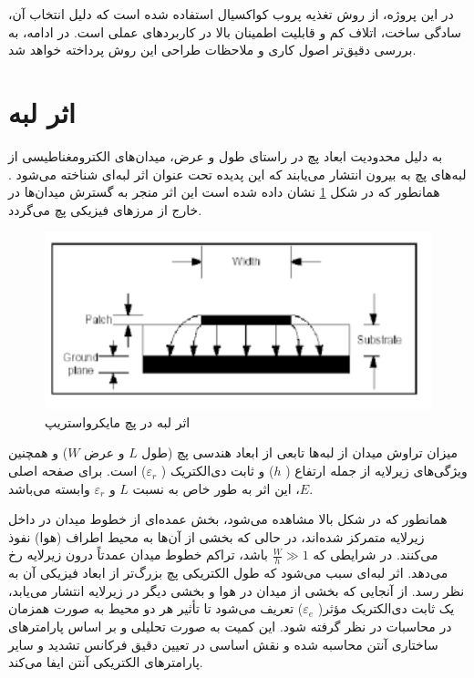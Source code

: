 در این پروژه، از روش تغذیه پروب کواکسیال استفاده شده است که دلیل انتخاب آن، سادگی ساخت، اتلاف کم و قابلیت اطمینان بالا در کاربردهای عملی است. در ادامه، به بررسی دقیق‌تر اصول کاری و ملاحظات طراحی این روش پرداخته خواهد شد.


\section{اثر لبه}

به دلیل محدودیت ابعاد پچ در راستای طول و عرض، میدان‌های الکترومغناطیسی از لبه‌های پچ به بیرون انتشار می‌یابند که این پدیده تحت عنوان اثر لبه‌ای
شناخته می‌شود
\cite{chahar}.
همانطور که در شکل 
\ref{fig8}
نشان داده شده است
این اثر منجر به گسترش میدان‌ها در خارج از مرزهای فیزیکی پچ می‌گردد.

\begin{figure}
	\centering
	\includegraphics[scale=0.3]{Images/fig8.png}
	\caption{اثر لبه در پچ مایکرواستریپ}
	\label{fig8}
\end{figure}

میزان تراوش میدان از لبه‌ها تابعی از ابعاد هندسی پچ (طول
$L$
 و عرض
$W$)
 و همچنین ویژگی‌های زیرلایه از جمله ارتفاع (
$h$)
 و ثابت دی‌الکتریک (
 $\varepsilon_r$)
 است. برای صفحه اصلی
 $E$،
  این اثر به طور خاص به نسبت
$L$
  و
$\varepsilon_r$
 وابسته می‌باشد.


همانطور که در شکل بالا مشاهده می‌شود، بخش عمده‌ای از خطوط میدان در داخل زیرلایه متمرکز شده‌اند، در حالی که بخشی از آن‌ها به محیط اطراف (هوا) نفوذ می‌کنند. در شرایطی که
$ \frac{W}{h} \gg 1$
 باشد، تراکم خطوط میدان عمدتاً درون زیرلایه رخ می‌دهد. اثر لبه‌ای سبب می‌شود که طول الکتریکی پچ بزرگ‌تر از ابعاد فیزیکی آن به نظر رسد. از آنجایی که بخشی از میدان در هوا و بخشی دیگر در زیرلایه انتشار می‌یابد، یک ثابت دی‌الکتریک مؤثر(
$\varepsilon_{e}$)
 تعریف می‌شود تا تأثیر هر دو محیط به صورت همزمان در محاسبات در نظر گرفته شود. این کمیت به صورت تحلیلی و بر اساس پارامترهای ساختاری آنتن محاسبه شده و نقش اساسی در تعیین دقیق فرکانس تشدید و سایر پارامترهای الکتریکی آنتن ایفا می‌کند.


